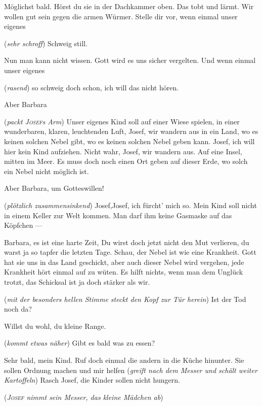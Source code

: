 \documentclass[
	final,
	a4paper,
	ngerman,
	mpinclude = true, %
	twoside = true,
	open = right,
	cleardoublepage = plain,
	DIV = 13,
	BCOR = 1cm,
	titlepage = firstiscover,
	]{scrbook}
\newcommand{\marginnote}[1]{\marginpar{\singlespacing\raggedright\footnotesize#1}}
\newcommand{\direction}[1]{(\textit{#1})}
\newcommand{\thecharacter}[1]{\textup{\textsc{#1}}\xspace}
\newcommand{\theBarbara}{\thecharacter{Barbara}}
\newcommand{\theJosef}{\thecharacter{Josef}}
\newcommand{\character}[1]{\item[#1]}
\newcommand{\Barbara}{\character{\theBarbara}}
\newcommand{\Josef}{\character{\theJosef}}
\newcommand{\Maedchen}[1]{\character{Mädchen #1}}
\begin{document}
\begin{play}
Möglichst bald. Hörst du sie in der Dachkammer oben. Das tobt und lärmt. Wir wollen gut sein gegen die armen Würmer. Stelle dir vor, wenn einmal unser eigenes

\Barbara
\direction{sehr schroff} Schweig still.

\Josef
Nun man kann nicht wissen. Gott wird es uns sicher vergelten. Und wenn einmal unser eigenes

\Barbara
\direction{rasend} so schweig doch schon, ich will das nicht hören.

\Josef
Aber Barbara

\Barbara
\direction{packt \theJosef{}s Arm} Unser eigenes Kind soll auf einer Wiese spielen, in einer wunderbaren, klaren, leuchtenden Luft, Josef, wir wandern aus in ein Land, wo es keinen solchen Nebel gibt, wo es keinen solchen Nebel geben kann. Josef, ich will hier kein Kind aufziehen. Nicht wahr, Josef, wir wandern aus. Auf eine Insel, mitten im Meer. Es muss doch noch einen Ort geben auf dieser Erde, wo solch ein Nebel nicht möglich ist.

\Josef
Aber Barbara, um Gotteswillen!

\Barbara
\direction{plötzlich zusammensinkend} Josef,Josef, ich fürcht' mich so. Mein Kind soll nicht in einem Keller zur Welt kommen. Man darf ihm keine Gasmaske auf das Köpfchen ---

\Josef
Barbara, es ist eine harte Zeit, Du wirst doch jetzt nicht den Mut verlieren, du warst ja so tapfer die letzten Tage. Schau, der Nebel ist wie eine Krankheit. Gott hat sie uns in das Land geschickt, aber auch dieser Nebel wird vergehen, jede Krankheit hört einmal auf zu wüten. Es hilft nichts, wenn man dem Unglück trotzt, das Schicksal ist ja doch stärker als wir.

\Maedchen{1}
\direction{mit der besonders hellen Stimme steckt den Kopf zur Tür herein} Ist der Tod noch da?

\marginnote{\emph{unartiges Kind}.\par(läufiges Mutterschwein)}
\Josef
Willst du wohl, du kleine Range.

\Maedchen{1}
\direction{kommt etwas näher} Gibt es bald was zu essen?

\Barbara
Sehr bald, mein Kind. Ruf doch einmal die andern in die Küche hinunter. Sie sollen Ordnung machen und mir helfen \direction{greift nach dem Messer und schält weiter Kartoffeln} Rasch Josef, die Kinder sollen nicht hungern.

\direction{\theJosef nimmt sein Messer, das kleine Mädchen ab}


\end{play}
\end{document}
